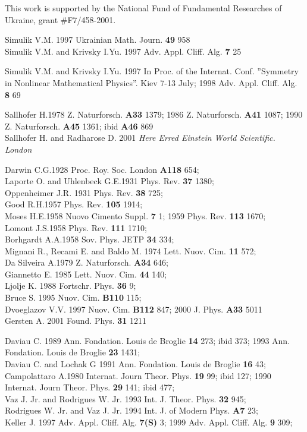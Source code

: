 \documentclass[a4paper,12pt]{article}
\begin{document}
This work is supported by the National Fund of Fundamental Researches of
Ukraine, grant \#F7/458-2001.

\begin{thebibliography}{99}
  Simulik V.M. 1997 Ukrainian Math. Journ. \textbf{49} 958\\ %
Simulik V.M. and Krivsky I.Yu. 1997 Adv. Appl. Cliff. Alg. \textbf{7} 25

  Simulik V.M. and Krivsky I.Yu. 1997 In Proc. of the Internat.
Conf. ''Symmetry in Nonlinear Mathematical Physics''. Kiev 7-13 July; 1998
Adv. Appl. Cliff. Alg. \textbf{8} 69

  Sallhofer H.1978 Z. Naturforsch. \textbf{A33} 1379; 1986 Z.
Naturforsch. \textbf{A41} 1087; 1990 Z. Naturforsch. \textbf{A45} 1361; ibid
\textbf{A46} 869\\ Sallhofer H. and Radharose D. 2001 \textit{Here Erred
Einstein World Scientific. London}

  Darwin C.G.1928 Proc. Roy. Soc. London \textbf{A118} 654;\\ %
Laporte O. and Uhlenbeck G.E.1931 Phys. Rev. \textbf{37} 1380;\\ Oppenheimer
J.R. 1931 Phys. Rev. \textbf{38} 725;\\ Good R.H.1957 Phys. Rev. \textbf{105}
1914;\\ Moses H.E.1958 Nuovo Cimento Suppl. \textbf{7} 1; 1959 Phys. Rev.
\textbf{113} 1670;\\ Lomont J.S.1958 Phys. Rev. \textbf{111} 1710;\\ %
Borhgardt A.A.1958 Sov. Phys. JETP \textbf{34} 334;\\ Mignani R., Recami E.
and Baldo M. 1974 Lett. Nuov. Cim. \textbf{11} 572;\\ Da Silveira A.1979 Z.
Naturforsch. \textbf{A34} 646;\\ Giannetto E. 1985 Lett. Nuov. Cim. \textbf{%
44} 140;\\ Ljolje K. 1988 Fortschr. Phys. \textbf{36} 9;\\ Bruce S. 1995
Nuov. Cim. \textbf{B110} 115;\\ Dvoeglazov V.V. 1997 Nuov. Cim. \textbf{B112}
847; 2000 J. Phys. \textbf{A33} 5011\\ Gersten A. 2001 Found. Phys. \textbf{%
31} 1211

  Daviau C. 1989 Ann. Fondation. Louis de Broglie \textbf{14}
273; ibid 373; 1993 Ann. Fondation. Louis de Broglie \textbf{23} 1431;\\ %
Daviau C. and Lochak G 1991 Ann. Fondation. Louis de Broglie \textbf{16} 43;%
\\ Campolattaro A.1980 Internat. Journ Theor. Phys. \textbf{19} 99; ibid
127; 1990 Internat. Journ Theor. Phys. \textbf{29} 141; ibid 477;\\ Vaz J.
Jr. and Rodrigues W. Jr. 1993 Int. J. Theor. Phys. \textbf{32} 945;\\ %
Rodrigues W. Jr. and Vaz J. Jr. 1994 Int. J. of Modern Phys. \textbf{A7 }23;%
\\ Keller J. 1997 Adv. Appl. Cliff. Alg. \textbf{7(S)} 3; 1999 Adv. Appl.
Cliff. Alg. \textbf{9} 309;


\end{thebibliography}
\end{document}
